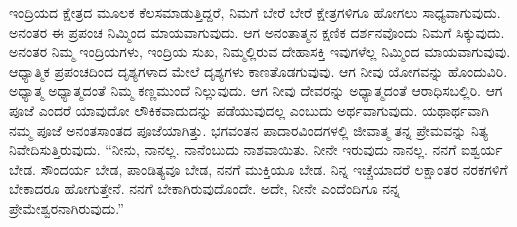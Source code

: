 ಇಂದ್ರಿಯದ ಕ್ಷೇತ್ರದ ಮೂಲಕ ಕೆಲಸಮಾಡುತ್ತಿದ್ದರೆ, ನಿಮಗೆ ಬೇರೆ ಬೇರೆ ಕ್ಷೇತ್ರಗಳಿಗೂ ಹೋಗಲು ಸಾಧ್ಯವಾಗುವುದು. ಅನಂತರ ಈ ಪ್ರಪಂಚ ನಿಮ್ಮಿಂದ ಮಾಯವಾಗುವುದು. ಆಗ ಅನಂತಾತ್ಮನ ಕ್ಷಣಿಕ ದರ್ಶನವೊಂದು ನಿಮಗೆ ಸಿಕ್ಕುವುದು. ಅನಂತರ ನಿಮ್ಮ ಇಂದ್ರಿಯಗಳು, ಇಂದ್ರಿಯ ಸುಖ, ನಿಮ್ಮಲ್ಲಿರುವ ದೇಹಾಸಕ್ತಿ ಇವುಗಳೆಲ್ಲ ನಿಮ್ಮಿಂದ ಮಾಯವಾಗುವುವು. ಆಧ್ಯಾತ್ಮಿಕ ಪ್ರಪಂಚದಿಂದ ದೃಶ್ಯಗಳಾದ ಮೇಲೆ ದೃಶ್ಯಗಳು ಕಾಣತೊಡಗುವುವು. ಆಗ ನೀವು ಯೋಗವನ್ನು ಹೊಂದುವಿರಿ. ಅಧ್ಯಾತ್ಮ ಅಧ್ಯಾತ್ಮದಂತೆ ನಿಮ್ಮ ಕಣ್ಣಮುಂದೆ ನಿಲ್ಲುವುದು. ಆಗ ನೀವು ದೇವರನ್ನು ಅಧ್ಯಾತ್ಮದಂತೆ ಆರಾಧಿಸಬಲ್ಲಿರಿ. ಆಗ ಪೂಜೆ ಎಂದರೆ ಯಾವುದೋ ಲೌಕಿಕವಾದುದನ್ನು ಪಡೆಯುವುದಲ್ಲ ಎಂಬುದು ಅರ್ಥವಾಗುವುದು. ಯಥಾರ್ಥವಾಗಿ ನಮ್ಮ ಪೂಜೆ ಅನಂತಸಾಂತದ ಪೂಜೆಯಾಗಿತ್ತು. ಭಗವಂತನ ಪಾದಾರವಿಂದಗಳಲ್ಲಿ ಜೀವಾತ್ಮ ತನ್ನ ಪ್ರೇಮವನ್ನು ನಿತ್ಯ ನಿವೇದಿಸುತ್ತಿರುವುದು. “ನೀನು, ನಾನಲ್ಲ. ನಾನೆಂಬುದು ನಾಶವಾಯಿತು. ನೀನೇ ಇರುವುದು ನಾನಲ್ಲ. ನನಗೆ ಐಶ್ವರ್ಯ ಬೇಡ. ಸೌಂದರ್ಯ ಬೇಡ, ಪಾಂಡಿತ್ಯವೂ ಬೇಡ, ನನಗೆ ಮುಕ್ತಿಯೂ ಬೇಡ. ನಿನ್ನ ಇಚ್ಚೆಯಾದರೆ ಲಕ್ಷಾಂತರ ನರಕಗಳಿಗೆ ಬೇಕಾದರೂ ಹೋಗುತ್ತೇನೆ. ನನಗೆ ಬೇಕಾಗಿರುವುದೊಂದೇ. ಅದೇ, ನೀನೇ ಎಂದೆಂದಿಗೂ ನನ್ನ ಪ್ರೇಮೇಶ್ವರನಾಗಿರುವುದು.”


